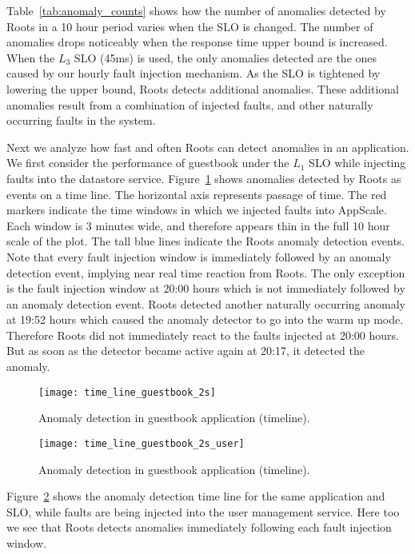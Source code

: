 Table~\ref{tab:anomaly_counts} shows how the number of anomalies detected by 
Roots in a 10 hour period varies when the SLO is changed. The number of anomalies
drops noticeably when the response time upper bound is increased. When the $L_3$
SLO (45ms) is used, the only anomalies detected are the ones
caused by our hourly fault injection mechanism. As the SLO is tightened by lowering the upper bound,
Roots detects additional anomalies. These additional anomalies
result from a combination of injected faults, and other naturally occurring faults
in the system.

Next we analyze how fast and often Roots can detect anomalies in an application. We
first consider the performance of guestbook under the $L_1$ SLO while 
injecting faults into the datastore service. Figure~\ref{fig:time_line_guestbook_2s} shows
anomalies detected by Roots as events on a time line. The horizontal axis represents 
passage of time. The red markers indicate the time windows in which we injected faults into
AppScale. Each window is 3 minutes wide, and therefore appears thin in the full 10 hour scale
of the plot. The tall blue lines indicate the Roots anomaly detection events.
Note that every fault injection window is immediately followed by an anomaly
detection event, implying near real time reaction from Roots. The only exception is the fault
injection window at 20:00 hours which is not immediately followed by an anomaly 
detection event. Roots detected another naturally occurring anomaly at 19:52 hours
which caused the anomaly detector to go into the warm up mode. Therefore Roots
did not immediately react to the faults injected at 20:00 hours. But as soon as the detector became
active again at 20:17, it detected the anomaly.

\begin{figure}
\centering
\texttt{[image: time\_line\_guestbook\_2s]}
\caption{Anomaly detection in guestbook application (timeline).}
\label{fig:time_line_guestbook_2s}
\end{figure}

\begin{figure}
\centering
\texttt{[image: time\_line\_guestbook\_2s\_user]}
\caption{Anomaly detection in guestbook application (timeline).}
\label{fig:time_line_guestbook_2s_user}
\end{figure}

Figure~\ref{fig:time_line_guestbook_2s_user} shows the anomaly detection time line for the 
same application and SLO, while faults are being injected into the user management service.
Here too we see that Roots detects anomalies immediately following each fault injection window.

